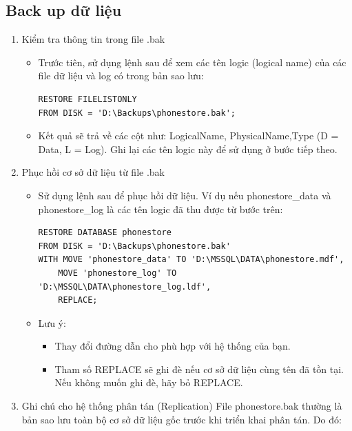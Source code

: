 \documentclass[a4paper,12pt]{report}
\begin{document}
\subsection{Back up dữ liệu}
\begin{enumerate}[label=B\arabic*:]
    \item Kiểm tra thông tin trong file .bak
    \begin{itemize}
        \item Trước tiên, sử dụng lệnh sau để xem các tên logic (logical name) của các file dữ liệu và log có trong bản sao lưu: \newline
        \begin{verbatim}
RESTORE FILELISTONLY 
FROM DISK = 'D:\Backups\phonestore.bak';
        \end{verbatim}
        \item Kết quả sẽ trả về các cột như: LogicalName, PhysicalName,\newline Type (D = Data, L = Log). Ghi lại các tên logic này để sử dụng ở bước tiếp theo.
    \end{itemize}
    \item Phục hồi cơ sở dữ liệu từ file .bak
    \begin{itemize}
        \item Sử dụng lệnh sau để phục hồi dữ liệu. Ví dụ nếu phonestore\_data và phonestore\_log là các tên logic đã thu được từ bước trên: \newline
        \begin{verbatim}
RESTORE DATABASE phonestore
FROM DISK = 'D:\Backups\phonestore.bak'
WITH MOVE 'phonestore_data' TO 'D:\MSSQL\DATA\phonestore.mdf',
    MOVE 'phonestore_log' TO 'D:\MSSQL\DATA\phonestore_log.ldf',
    REPLACE;
        \end{verbatim}
        \item Lưu ý:
        \begin{itemize}
            \item Thay đổi đường dẫn cho phù hợp với hệ thống của bạn.
            \item Tham số REPLACE sẽ ghi đè nếu cơ sở dữ liệu cùng tên đã tồn tại. Nếu không muốn ghi đè, hãy bỏ REPLACE.
        \end{itemize}
    \end{itemize}    
    \item Ghi chú cho hệ thống phân tán (Replication) \newline
    File phonestore.bak thường là bản sao lưu toàn bộ cơ sở dữ liệu gốc trước khi triển khai phân tán. Do đó:

\end{enumerate}
\end{document}
